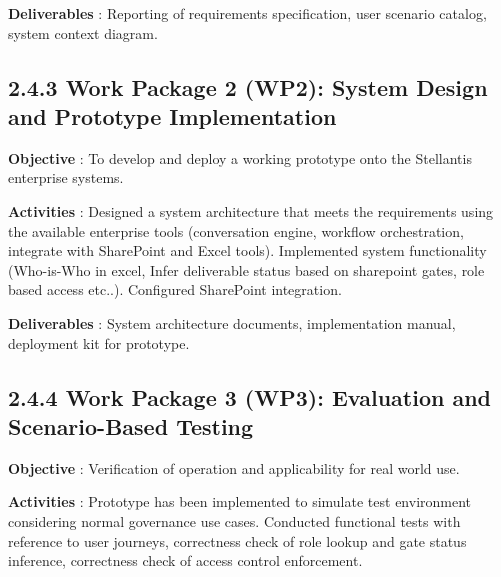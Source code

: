 \vspace{0.2cm}

\noindent\textbf{Deliverables} : Reporting of requirements specification, user scenario catalog, system context diagram.

\vspace{0.5cm}

\subsection*{\textcolor[HTML]{003D99}{2.4.3 Work Package 2 (WP2): System Design and Prototype Implementation}}

\noindent\textbf{Objective} : To develop and deploy a working prototype onto the Stellantis enterprise systems.

\vspace{0.2cm}

\noindent\textbf{Activities} : Designed a system architecture that meets the requirements using the available enterprise tools (conversation engine, workflow orchestration, integrate with SharePoint and Excel tools). Implemented system functionality (Who-is-Who in excel, Infer deliverable status based on sharepoint gates, role based access etc..). Configured SharePoint integration.

\vspace{0.2cm}

\noindent\textbf{Deliverables} : System architecture documents, implementation manual, deployment kit for prototype.

\vspace{0.5cm}

\subsection*{\textcolor[HTML]{003D99}{2.4.4 Work Package 3 (WP3): Evaluation and Scenario-Based Testing}}

\noindent\textbf{Objective} : Verification of operation and applicability for real world use.

\vspace{0.2cm}

\noindent\textbf{Activities} : Prototype has been implemented to simulate test environment considering normal governance use cases. Conducted functional tests with reference to user journeys, correctness check of role lookup and gate status inference, correctness check of access control enforcement.

\vspace{0.2cm}

